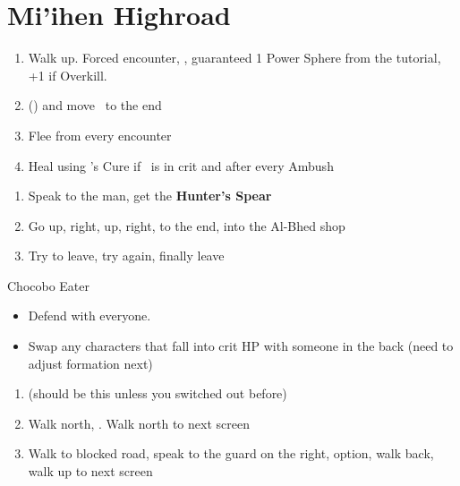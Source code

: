 \chapter{Mi'ihen Highroad}

\begin{enumerate}
    \item Walk up. Forced encounter, \sd, guaranteed 1 Power Sphere from the tutorial, +1 if Overkill.
    \item \formation{\tidus}{\wakka}{\auron} (\swap{\yuna}{\auron}) and move \yuna\ to the end
    \item Flee from every encounter
    \item Heal using \yuna's Cure if \tidus\ is in crit and after every Ambush
\end{enumerate}
\wincb\losscb\bothcb
\begin{enumerate}[resume]
    \item Speak to the man, get the \textbf{Hunter's Spear}
    \item Go up, right, up, right, to the end, into the Al-Bhed shop
    \item Try to leave, try again, finally leave
\end{enumerate}
\begin{battle}{Chocobo Eater}
    \begin{itemize}
        \tidusf Haste Boss
        \item Defend with everyone.
        \item Swap any characters that fall into crit HP with someone in the back (need to adjust formation next)
    \end{itemize}
\end{battle}
\begin{enumerate}[resume]
    \item \formation{\tidus}{\wakka}{\auron} (should be this unless you switched out before)
    \item Walk north, \save. Walk north to next screen
    \item Walk to blocked road, speak to the guard on the right,  option, walk back, walk up to next screen
\end{enumerate}
